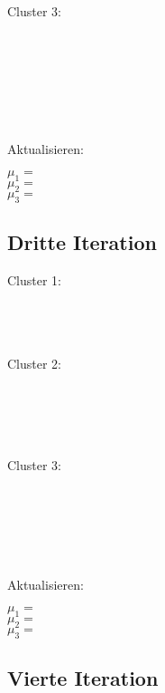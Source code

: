 \mat[1,4]\\
\mat[3,2]\\
\mat[3,3]\\
\mat[4,1]\\

Cluster 3:

\mat[5,1]\\
\mat[6,2]\\
\mat[6,3]\\
\mat[8,4]\\
\mat[8,5]\\
\mat[8,6]\\

Aktualisieren:

$\mu_1 = $\mat[1,5.5]\\
$\mu_2 = $\mat[11/4, 10/4]\\
$\mu_3 = $\mat[41/6, 21/6]\\



\subsection{Dritte Iteration}

Cluster 1:

\mat[1,6]\\
\mat[1,5]\\
\mat[1,4]\\

Cluster 2:

\mat[3,2]\\
\mat[3,3]\\
\mat[4,1]\\
\mat[5,1]\\


Cluster 3:

\mat[6,2]\\
\mat[6,3]\\
\mat[8,4]\\
\mat[8,5]\\
\mat[8,6]\\

Aktualisieren:

$\mu_1 = $\mat[1, 5]\\
$\mu_2 = $\mat[15/4, 7/4]\\
$\mu_3 = $\mat[36/5, 20/5]\\


\subsection{Vierte Iteration}

